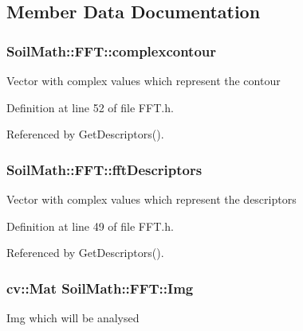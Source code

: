 \subsection{Member Data Documentation}
\hypertarget{class_soil_math_1_1_f_f_t_a48141f0c777ca86f2e536f88b509b639}{}
\subsubsection[{complexcontour}]{ Soil\+Math\+::\+F\+F\+T\+::complexcontour\hspace{0.3cm}{\ttfamily [private]}}\label{class_soil_math_1_1_f_f_t_a48141f0c777ca86f2e536f88b509b639}
Vector with complex values which represent the contour 

Definition at line 52 of file F\+F\+T.\+h.



Referenced by Get\+Descriptors().

\hypertarget{class_soil_math_1_1_f_f_t_a466b360529319d0e6e3220f446f703be}{}
\subsubsection[{fft\+Descriptors}]{ Soil\+Math\+::\+F\+F\+T\+::fft\+Descriptors\hspace{0.3cm}{\ttfamily [private]}}\label{class_soil_math_1_1_f_f_t_a466b360529319d0e6e3220f446f703be}
Vector with complex values which represent the descriptors 

Definition at line 49 of file F\+F\+T.\+h.



Referenced by Get\+Descriptors().

\hypertarget{class_soil_math_1_1_f_f_t_a2efda8f90cd255a2c18352636352044f}{}
\subsubsection[{Img}]{\setlength{\rightskip}{0pt plus 5cm}cv\+::\+Mat Soil\+Math\+::\+F\+F\+T\+::\+Img\hspace{0.3cm}{\ttfamily [private]}}\label{class_soil_math_1_1_f_f_t_a2efda8f90cd255a2c18352636352044f}
Img which will be analysed 

